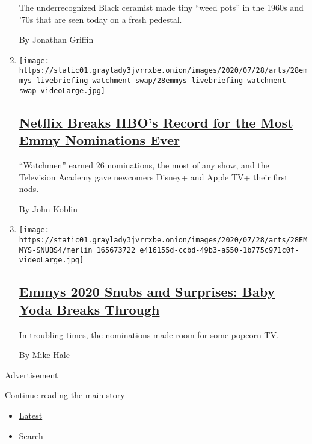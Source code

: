 \begin{enumerate}
  The underrecognized Black ceramist made tiny ``weed pots'' in the
  1960s and '70s that are seen today on a fresh pedestal.

  By Jonathan Griffin
\item
  \texttt{[image: https://static01.graylady3jvrrxbe.onion/images/2020/07/28/arts/28emmys-livebriefing-watchment-swap/28emmys-livebriefing-watchment-swap-videoLarge.jpg]}

  \hypertarget{netflix-breaks-hbos-record-for-the-most-emmy-nominations-ever}{%
  \subsection{\texorpdfstring{\href{/2020/07/28/arts/television/emmy-nominations.html}{Netflix
  Breaks HBO's Record for the Most Emmy Nominations
  Ever}}{Netflix Breaks HBO's Record for the Most Emmy Nominations Ever}}\label{netflix-breaks-hbos-record-for-the-most-emmy-nominations-ever}}

  ``Watchmen'' earned 26 nominations, the most of any show, and the
  Television Academy gave newcomers Disney+ and Apple TV+ their first
  nods.

  By John Koblin
\item
  \texttt{[image: https://static01.graylady3jvrrxbe.onion/images/2020/07/28/arts/28EMMYS-SNUBS4/merlin\_165673722\_e416155d-ccbd-49b3-a550-1b775c971c0f-videoLarge.jpg]}

  \hypertarget{emmys-2020-snubs-and-surprises-baby-yoda-breaks-through}{%
  \subsection{\texorpdfstring{\href{/2020/07/28/arts/television/emmys-snubs-mandalorian-zendaya-reese.html}{Emmys
  2020 Snubs and Surprises: Baby Yoda Breaks
  Through}}{Emmys 2020 Snubs and Surprises: Baby Yoda Breaks Through}}\label{emmys-2020-snubs-and-surprises-baby-yoda-breaks-through}}

  In troubling times, the nominations made room for some popcorn TV.

  By Mike Hale
\end{enumerate}

Advertisement

\protect\hyperlink{after-mid1}{Continue reading the main story}

\begin{itemize}
\tightlist
\item
  \protect\hyperlink{stream-panel}{Latest}
\item
  Search
\end{itemize}

